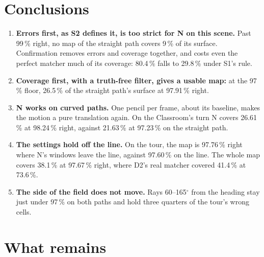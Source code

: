 \documentclass[11pt,a4paper]{article}
\begin{document}
\section{Conclusions}\label{sec:conclusions}

\begin{enumerate}
\item \textbf{Errors first, as S2 defines it, is too strict for N on this scene.} Past 99\,\% right, no map of the
  straight path covers 9\,\% of its surface. Confirmation removes errors and coverage together, and costs even the
  perfect matcher much of its coverage: 80.4\,\% falls to 29.8\,\% under S1's rule.
\item \textbf{Coverage first, with a truth-free filter, gives a usable map:} at the 97\,\% floor, 26.5\,\% of the
  straight path's surface at 97.91\,\% right.
\item \textbf{N works on curved paths.} One pencil per frame, about its baseline, makes the motion a pure translation
  again. On the Classroom's turn N covers 26.61\,\% at 98.24\,\% right, against 21.63\,\% at 97.23\,\% on the straight
  path.
\item \textbf{The settings hold off the line.} On the tour, the map is 97.76\,\% right where N's windows leave the line,
  against 97.60\,\% on the line. The whole map covers 38.1\,\% at 97.67\,\% right, where D2's real matcher covered 41.4\,\%
  at 73.6\,\%.
\item \textbf{The side of the field does not move.} Rays 60--165$^\circ$ from the heading stay just under 97\,\% on both
  paths and hold three quarters of the tour's wrong cells.
\end{enumerate}

\section{What remains}\label{sec:remains}
\end{document}
